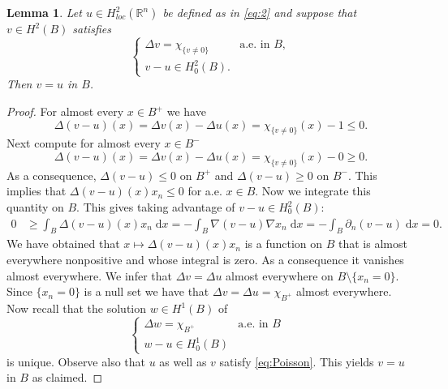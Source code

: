 \documentclass[twoside,11pt]{article}
\newtheorem{lemma}{Lemma}
\theoremstyle{definition}
\begin{document}
\fi 



\begin{lemma}\label{lem:aSerrinTypeprobl}
    Let $u \in H^2_{loc}(\mathbb{R}^n)$ be defined as in \eqref{eq:2} and suppose that $v \in H^2(B)$ satisfies 
    \begin{equation*}
        \begin{cases}
            \Delta v = \chi_{\{ v \neq 0 \} }  & \textrm{a.e. in $B$}, \\ v-u \in H_0^2(B).
        \end{cases}
    \end{equation*}
    Then $v = u$ in $B$. 
\end{lemma}
\begin{proof}
For almost every $x \in B^+$ we have
\begin{equation*}
    \Delta (v-u )(x) = \Delta v(x) - \Delta u(x) = \chi_{\{ v\neq 0 \}}(x) - 1 \leq 0.
\end{equation*}
Next compute for almost every $x \in B^-$ 
\begin{equation*}
    \Delta (v-u )(x) = \Delta v(x) - \Delta u(x) = \chi_{\{ v\neq 0 \}}(x) - 0 \geq 0.
\end{equation*}
 As a consequence, $\Delta (v-u) \leq 0$ on $B^+$ and $\Delta (v-u) \geq 0$ on $B^-$.
 This implies that $\Delta (v-u)(x) x_n \leq 0$ for a.e. $x \in B$. Now we integrate this quantity on $B$. This gives taking advantage of $v-u\in H^2_0 (B):$ 
\begin{align*}
     0  & \geq \int_B \Delta (v-u)(x) x_n \; \mathrm{d}x = - \int_B \nabla (v-u) \nabla x_n \; \mathrm{d}x 
      = - \int_B \partial_n (v-u) \; \mathrm{d}x =0.
\end{align*}
We have obtained that $x \mapsto \Delta (v-u)(x) x_n$ is a function on $B$ that is almost everywhere nonpositive and whose integral is zero. As a consequence it   vanishes almost everywhere. We infer that $\Delta v = \Delta u$ almost everywhere on $B \setminus \{ x_n = 0 \}$. Since $\{x_n =0 \}$ is a null set we have that $\Delta v = \Delta u = \chi_{B^+}$ almost everywhere.  Now recall that the solution $w \in H^1(B)$ of 
\begin{equation}\label{eq:Poisson}
    \begin{cases}
        \Delta w = \chi_{B^+}  & \textrm{a.e. in $B$ } \\
        w - u \in H_0^1(B)
    \end{cases}
\end{equation}
is unique. Observe also  that $u$ as well as $v$ satisfy \eqref{eq:Poisson}. This yields $v = u$ in $B$ as claimed. \end{proof}
\end{document}
